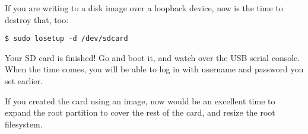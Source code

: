 \documentclass{sockitguide}
\begin{document}
If you are writing to a disk image over a loopback device, now is the
time to destroy that, too:
\begin{verbatim}
$ sudo losetup -d /dev/sdcard
\end{verbatim}

Your SD card is finished! Go and boot it, and watch over the USB serial
console. When the time comes, you will be able to log in with username
and password you set earlier.

If you created the card using an image, now would be an excellent time
to expand the root partition to cover the rest of the card, and resize
the root filesystem.
\end{document}
